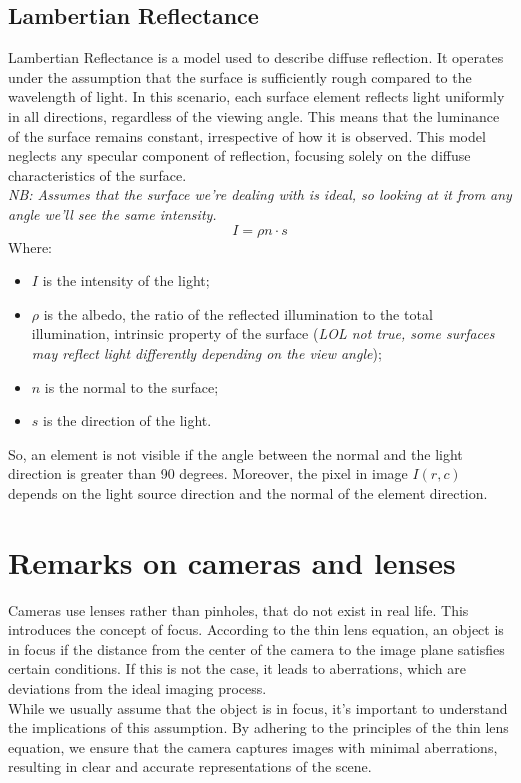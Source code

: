 \subsection{Lambertian Reflectance}
Lambertian Reflectance is a model used to describe diffuse reflection. It operates under the assumption that the surface is sufficiently rough compared to the wavelength of light. In this scenario, each surface element reflects light uniformly in all directions, regardless of the viewing angle. This means that the luminance of the surface remains constant, irrespective of how it is observed. 
This model neglects any specular component of reflection, focusing solely on the diffuse characteristics of the surface.
\\\textit{NB: Assumes that the surface we're dealing with is ideal, so looking at it from any angle we'll see the same intensity.}
\[
    I = \rho n \cdot s
\]
Where:
\begin{itemize}
    \item $I$ is the intensity of the light;
    \item $\rho$ is the albedo, the ratio of the reflected illumination to the total illumination, intrinsic property of the surface (\textit{LOL not true, some surfaces may reflect light differently depending on the view angle});
    \item $n$ is the normal to the surface;
    \item $s$ is the direction of the light.
\end{itemize}
So, an element is not visible if the angle between the normal and the light direction is greater than 90 degrees.
Moreover, the pixel in image $I(r,c)$ depends on the light source direction and the normal of the element direction.

\section{Remarks on cameras and lenses}
Cameras use lenses rather than pinholes, that do not exist in real life. This introduces the concept of focus. 
According to the thin lens equation, an object is in focus if the distance from the center of the camera to the image plane satisfies certain conditions. 
If this is not the case, it leads to aberrations, which are deviations from the ideal imaging process.
\\
While we usually assume that the object is in focus, it's important to understand the implications of this assumption. 
By adhering to the principles of the thin lens equation, we ensure that the camera captures images with minimal aberrations, resulting in clear and accurate representations of the scene.
